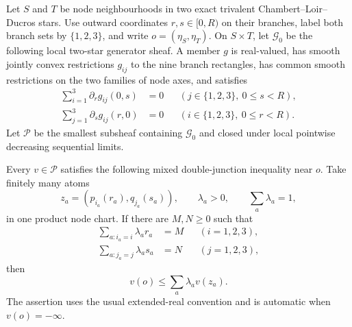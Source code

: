 
\begin{proposition}
\label{prop:p071-trivalent-double-junction-obstruction}
Let $S$ and $T$ be node neighbourhoods in two exact trivalent
Chambert--Loir--Ducros stars.  Use outward coordinates
$r,s\in[0,R)$ on their branches, label both branch sets by
$\{1,2,3\}$, and write $o=(\eta_S,\eta_T)$.  On $S\times T$, let
$\mathcal G_0$ be the following local two-star generator sheaf.  A member
$g$ is real-valued, has smooth jointly convex restrictions $g_{ij}$ to the
nine branch rectangles, has common smooth restrictions on the two families
of node axes, and satisfies
\begin{align}
 \sum_{i=1}^3\partial_rg_{ij}(0,s)&=0
       &&(j\in\{1,2,3\},\ 0\leq s<R),
 \label{eq:p071-trivalent-first-balance}\\
 \sum_{j=1}^3\partial_sg_{ij}(r,0)&=0
       &&(i\in\{1,2,3\},\ 0\leq r<R).
 \label{eq:p071-trivalent-second-balance}
\end{align}
Let $\mathcal P$ be the smallest subsheaf containing $\mathcal G_0$ and
closed under local pointwise decreasing sequential limits.

Every $v\in\mathcal P$ satisfies the following mixed double-junction
inequality near $o$.  Take finitely many atoms
\[
 z_a=(p_{i_a}(r_a),q_{j_a}(s_a)),
 \qquad \lambda_a>0,
 \qquad \sum_a\lambda_a=1,
\]
in one product node chart.  If there are $M,N\geq0$ such that
\begin{align}
 \sum_{a:i_a=i}\lambda_ar_a&=M
       &&(i=1,2,3),
 \label{eq:p071-trivalent-first-moment}\\
 \sum_{a:j_a=j}\lambda_as_a&=N
       &&(j=1,2,3),
 \label{eq:p071-trivalent-second-moment}
\end{align}
then
\begin{equation}
                       v(o)\leq\sum_a\lambda_av(z_a).
 \label{eq:p071-trivalent-mixed-jensen}
\end{equation}
The assertion uses the usual extended-real convention and is automatic
when $v(o)=-\infty$.


\end{proposition}

